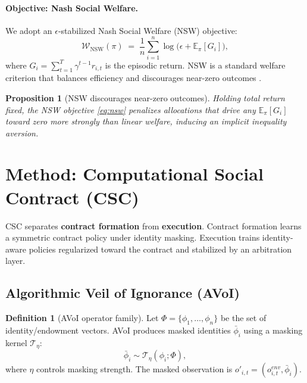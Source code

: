 \documentclass{article}
\theoremstyle{definition}
\newtheorem{definition}{Definition}
\theoremstyle{plain}
\newtheorem{proposition}{Proposition}
\theoremstyle{remark}
\newcommand{\NSW}{\mathcal{W}_{\mathrm{NSW}}}
\newcommand{\E}{\mathbb{E}}
\begin{document}
\paragraph{Objective: Nash Social Welfare.}
We adopt an $\epsilon$-stabilized Nash Social Welfare (NSW) objective:
\begin{equation}
\label{eq:nsw}
\NSW(\pi) \;=\; \frac{1}{n} \sum_{i=1}^n \log\!\big(\epsilon + \E_\pi[G_i]\big),
\end{equation}
where $G_i=\sum_{t=1}^T \gamma^{t-1} r_{i,t}$ is the episodic return.
NSW is a standard welfare criterion that balances efficiency and discourages near-zero outcomes \citep{nash1950bargaining,kalai1975other}.

\begin{proposition}[NSW discourages near-zero outcomes]
\label{prop:nsw_pareto}
Holding total return fixed, the NSW objective \eqref{eq:nsw} penalizes allocations that drive any $\E_\pi[G_i]$ toward zero more strongly than linear welfare, inducing an implicit inequality aversion.
\end{proposition}

\section{Method: Computational Social Contract (CSC)}
\label{sec:method}

CSC separates \textbf{contract formation} from \textbf{execution}.
Contract formation learns a symmetric contract policy under identity masking.
Execution trains identity-aware policies regularized toward the contract and stabilized by an arbitration layer.

\subsection{Algorithmic Veil of Ignorance (AVoI)}
\label{sec:avoi}

\begin{definition}[AVoI operator family]
Let $\Phi=\{\phi_1,\dots,\phi_n\}$ be the set of identity/endowment vectors.
AVoI produces masked identities $\bar{\phi}_i$ using a masking kernel $\mathcal{T}_\eta$:
\[
\bar{\phi}_i \sim \mathcal{T}_\eta(\phi_i;\Phi),
\]
where $\eta$ controls masking strength.
The masked observation is $o'_{i,t}=(o^{env}_{i,t}, \bar{\phi}_i)$.
\end{definition}
\end{document}

